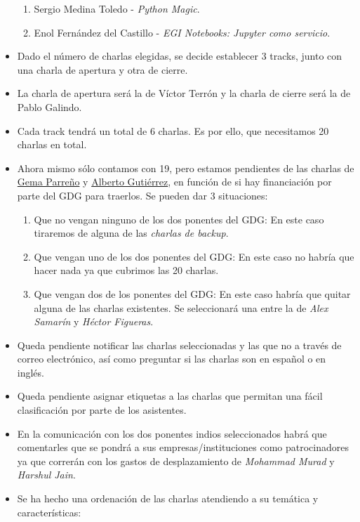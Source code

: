 \documentclass[a4paper, 12pt]{article}
\begin{document}
\begin{itemize}
\begin{enumerate}
            \item Sergio Medina Toledo - \textit{Python Magic}.
            \item Enol Fernández del Castillo - \textit{EGI Notebooks: Jupyter como servicio}.
        \end{enumerate}
        \item Dado el número de charlas elegidas, se decide establecer 3 tracks, junto con una charla de apertura y otra de cierre.
        \item La charla de apertura será la de Víctor Terrón y la charla de cierre será la de Pablo Galindo.
        \item Cada track tendrá un total de 6 charlas. Es por ello, que necesitamos 20 charlas en total.
        \item Ahora mismo sólo contamos con 19, pero estamos pendientes de las charlas de \href{https://twitter.com/SoyGema}{Gema Parreño} y \href{https://twitter.com/aljesusg}{Alberto Gutiérrez}, en función de si hay financiación por parte del GDG para traerlos. Se pueden dar 3 situaciones:
        \begin{enumerate}
            \item Que no vengan ninguno de los dos ponentes del GDG: En este caso tiraremos de alguna de las \textit{charlas de backup}.
            \item Que vengan uno de los dos ponentes del GDG: En este caso no habría que hacer nada ya que cubrimos las 20 charlas.
            \item Que vengan dos de los ponentes del GDG: En este caso habría que quitar alguna de las charlas existentes. Se seleccionará una entre la de \textit{Alex Samarín} y \textit{Héctor Figueras}.
        \end{enumerate}
        \item Queda pendiente notificar las charlas seleccionadas y las que no a través de correo electrónico, así como preguntar si las charlas son en español o en inglés.
        \item Queda pendiente asignar etiquetas a las charlas que permitan una fácil clasificación por parte de los asistentes.
        \item En la comunicación con los dos ponentes indios seleccionados habrá que comentarles que se pondrá a sus empresas/instituciones como patrocinadores ya que correrán con los gastos de desplazamiento de \textit{Mohammad Murad} y \textit{Harshul Jain}.
        \item Se ha hecho una ordenación de las charlas atendiendo a su temática y características:


\end{itemize}
\end{document}
